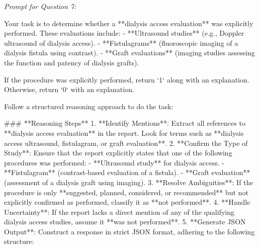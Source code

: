\textit{\normalsize Prompt for Question  7:}
\begin{mdframed}[]
\normalsize

Your task is to determine whether a **dialysis access evaluation** was explicitly performed. These evaluations include:  
- **Ultrasound studies** (e.g., Doppler ultrasound of dialysis access).  
- **Fistulagrams** (fluoroscopic imaging of a dialysis fistula using contrast).  
- **Graft evaluations** (imaging studies assessing the function and patency of dialysis grafts).  

If the procedure was explicitly performed, return `1` along with an explanation. Otherwise, return `0` with an explanation.

Follow a structured reasoning approach to do the task:

### **Reasoning Steps**  
1. **Identify Mentions**: Extract all references to **dialysis access evaluation** in the report. Look for terms such as **dialysis access ultrasound, fistulagram, or graft evaluation**.  
2. **Confirm the Type of Study**: Ensure that the report explicitly states that one of the following procedures was performed:  
   - **Ultrasound study** for dialysis access.  
   - **Fistulagram** (contrast-based evaluation of a fistula).  
   - **Graft evaluation** (assessment of a dialysis graft using imaging).  
3. **Resolve Ambiguities**: If the procedure is only **suggested, planned, considered, or recommended** but not explicitly confirmed as performed, classify it as **not performed**.  
4. **Handle Uncertainty**: If the report lacks a direct mention of any of the qualifying dialysis access studies, assume it **was not performed**.  
5. **Generate JSON Output**: Construct a response in strict JSON format, adhering to the following structure:  

\end{mdframed}

